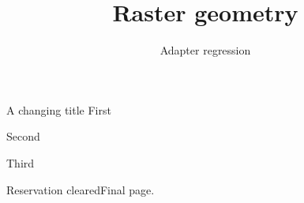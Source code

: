 \documentclass[aspectratio=169]{beamer}
\title{Raster geometry}\author{Adapter regression}\date{}
\begin{document}
\begin{frame}[plain]\titlepage\end{frame}
\begin{frame}{A changing title}
First\pause\par Second\pause\par Third
\end{frame}
\floraclearreserve
\begin{frame}{Reservation cleared}Final page.\end{frame}
\end{document}
